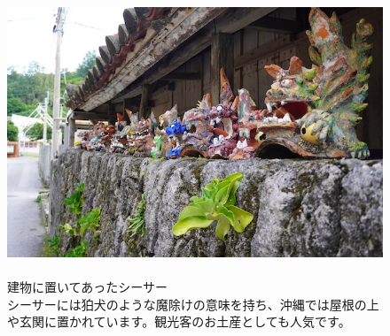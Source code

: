 \documentclass[../main]{subfiles}
\begin{document}
\begin{figure}[H]
  \begin{minipage}[b]{0.48\columnwidth}
    \caption{\\
    建物に置いてあったシーサー\\
    シーサーには狛犬のような魔除けの意味を持ち、沖縄では屋根の上や玄関に置かれています。観光客のお土産としても人気です。
    }
  \end{minipage}
  \hspace{0.04\columnwidth} %
  \begin{minipage}[b]{0.48\columnwidth}
    \centering
    \includegraphics[width=\columnwidth]{figure/zamami_si-sa-.jpg}
  \end{minipage}
\end{figure}
\end{document}
